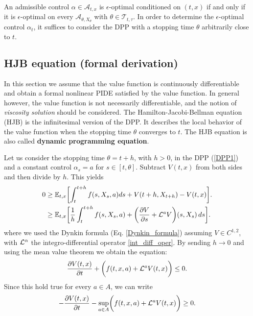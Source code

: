 An admissible control $\alpha \in \mathcal{A}_{t,x}$ is $\epsilon$-optimal conditioned on $(t,x)$ if and only if it is $\epsilon$-optimal 
on every $\mathcal{A}_{\theta, X_{\theta}}$ with 
$\theta \in \mathcal{T}_{t,\tau}$. In order to determine the $\epsilon$-optimal control $\alpha_t$, it suffices to consider the DPP with a stopping time $\theta$
arbitrarily close to $t$.

\subsection{HJB equation (formal derivation)}

In this section we assume that the value function is continuously differentiable and obtain a formal nonlinear PIDE satisfied by the value function.
In general however, the value function is not necessarily differentiable, and the notion of \emph{viscosity solution} should be considered.
The Hamilton-Jacobi-Bellman equation (HJB) is the infinitesimal version of the DPP. It describes the local behavior of the value function when the stopping time $\theta$ converges to $t$. 
The HJB equation is also called \textbf{dynamic programming equation}.
\newline

\noindent
Let us consider the stopping time $\theta = t + h$, with $h>0$, in the DPP (\ref{DPP1}) and a constant control $\alpha_s = a$ for $s \in [t,\theta]$. 
Subtract $V(t,x)$ from both sides and then divide by $h$. This yields
\begin{align*}
   0 \geq& \; \mathbb{E}_{t,x} \biggl[ \int_t^{t+h} f(s,X_s,a) ds + V(t+h, X_{t+h}) - V(t,x) \biggr]. \\ 
     \geq& \; \mathbb{E}_{t,x} \biggl[ \frac{1}{h} \int_t^{t+h} f(s,X_s,a) 
     + \biggl( \frac{\partial V}{\partial s} + \mathcal{L}^{a}V \biggr)(s, X_{s}) \, ds \biggr]. \\
\end{align*}
where we used the Dynkin formula (Eq. \ref{Dynkin_formula}) assuming $V \in C^{1,2}$, with $\mathcal{L}^{\alpha}$ the integro-differential operator \ref{int_diff_oper}.
By sending $h \to 0$ and using the mean value theorem we obtain the equation:
\begin{equation}
 \frac{\partial V(t,x)}{\partial t} + \biggl( f(t,x,a) + \mathcal{L}^{a}V(t,x)  \biggr) \leq 0.
\end{equation}
Since this hold true for every $a \in A$, we can write
\begin{equation}\label{ineq_HJB}
 -\frac{\partial V(t,x)}{\partial t} - \sup_{a \in A} \biggl( f(t,x,a) + \mathcal{L}^{a}V(t,x)  \biggr) \geq 0.
\end{equation}

